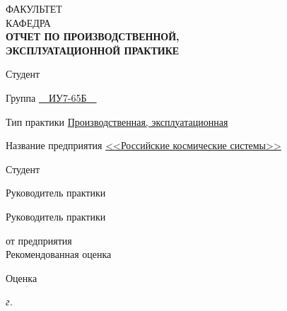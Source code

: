 \begin{titlepage}
{	\small
	ФАКУЛЬТЕТ  \\
	\vspace{3.3mm}
	КАФЕДРА  \\
		
	\vspace{15.8mm}
		\Large \bfseries
		ОТЧЕТ ПО ПРОИЗВОДСТВЕННОЙ,\\
		ЭКСПЛУАТАЦИОННОЙ ПРАКТИКЕ \\
	}

	\vspace{10.8mm}

	Студент \uline{\hfill{}\hfill}
	
	
	\vspace{3.3mm}
	
	Группа \uline{~~ИУ7-65Б~~}
	
	
	\vspace{1.3mm}
	 
	
	Тип практики \uline{\hfill Производственная, эксплуатационная \hfill} 
	
	
	\vspace{1.3mm}
	
	
	Название предприятия \uline{\hfill <<Российские космические системы>> \hfill} \\ 
	
	\vspace{10.8mm}
	
	Студент \hfill
	\uline{} 
	\uline{}
	
	\vspace{1mm}
	
	Руководитель практики \hfill
	\uline{} 
	\uline{}
	
	\vspace{1mm}
	
	Руководитель практики
	
	\vspace{1.5pt}
	
	от предприятия \hfill
	\uline{} 
	\uline{}\\
	
	Рекомендованная оценка \uline{\hspace*{5cm}}
	
	\vspace{3.3mm} 
	
	Оценка \uline{\hspace*{8.9cm}} \\
	
	\vspace{1.3mm} 
	
	\centering 
	{
		\textit{{\the\year} г.}
	}
	

\end{titlepage}